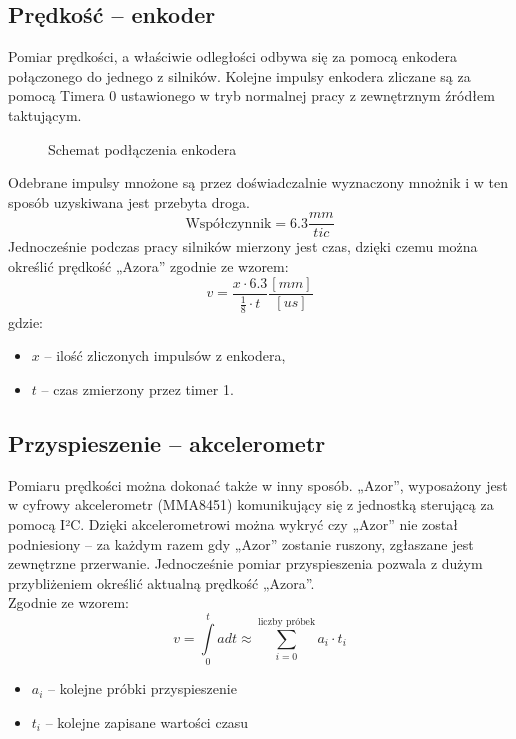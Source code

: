     \subsection{Prędkość -- enkoder}
        \tab Pomiar prędkości, a właściwie odległości odbywa się za pomocą enkodera połączonego do jednego z silników.
        Kolejne impulsy enkodera zliczane są za pomocą Timera 0 ustawionego w tryb normalnej pracy z zewnętrznym źródłem taktującym.  %
        \begin{figure}[!h]
            \centering
            \begin{tikzpicture}
                
            \end{tikzpicture}
            \caption{Schemat podłączenia enkodera}
        \end{figure}
        Odebrane impulsy mnożone są przez doświadczalnie wyznaczony mnożnik i w ten sposób uzyskiwana jest przebyta droga.
        \begin{equation*}
            \text{Współczynnik} = 6.3 \frac{mm}{tic}
        \end{equation*}
        Jednocześnie podczas pracy silników mierzony jest czas, dzięki czemu można określić prędkość „Azora” zgodnie ze wzorem:
        \begin{equation*}
            v = \frac{x\cdot 6.3}{\frac{1}{8}\cdot t}\frac{[mm]}{[us]}
        \end{equation*}
        gdzie:
        \begin{itemize}
            \item $x$ -- ilość zliczonych impulsów z enkodera,
            \item $t$ -- czas zmierzony przez timer 1.
        \end{itemize}
        
    \subsection{Przyspieszenie -- akcelerometr}
        \tab Pomiaru prędkości można dokonać także w inny sposób.
        „Azor”, wyposażony jest w cyfrowy akcelerometr (MMA8451) komunikujący się z jednostką sterującą za pomocą I²C.
        Dzięki akcelerometrowi można wykryć czy „Azor” nie został podniesiony -- za każdym razem gdy „Azor” zostanie ruszony, zgłaszane jest zewnętrzne przerwanie. 
        Jednocześnie pomiar przyspieszenia pozwala z dużym przybliżeniem określić aktualną prędkość „Azora”.\\
        Zgodnie ze wzorem:
        \begin{equation*}
            v = \int\limits_{0}^{t} a dt \approx \sum_{i = 0}^{\text{liczby próbek}} a_i \cdot t_i
        \end{equation*}
        \begin{itemize}
            \item $a_i$ -- kolejne próbki przyspieszenie
            \item $t_i$ -- kolejne zapisane wartości czasu
        \end{itemize}

